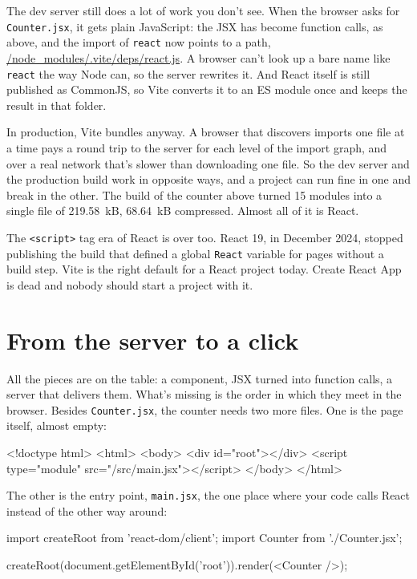 The dev server still does a lot of work you don't see. When the browser asks
for \texttt{Counter.jsx}, it gets plain JavaScript: the JSX has become function
calls, as above, and the import of \texttt{react} now points to a path,
\url{/node_modules/.vite/deps/react.js}. A browser
can't look up a bare name like \texttt{react} the way Node can, so the server
rewrites it. And React itself is still published as CommonJS, so Vite converts
it to an ES module once and keeps the result in that folder.

In production, Vite bundles anyway. A browser that discovers imports one file
at a time pays a round trip to the server for each level of the import graph,
and over a real network that's slower than downloading one file. So the dev
server and the production build work in opposite ways, and a project can run
fine in one and break in the other. The build of the counter above turned 15
modules into a single file of 219.58~kB, 68.64~kB compressed. Almost all of it
is React.

The \texttt{<script>} tag era of React is over too. React 19, in December 2024,
stopped publishing the build that defined a global \texttt{React} variable for
pages without a build step. Vite is the right default for a React project today.
Create React App is dead and nobody should start a project with it.

\section{From the server to a click}
\label{sec:click}

All the pieces are on the table: a component, JSX turned into function calls, a
server that delivers them. What's missing is the order in which they meet in
the browser. Besides \texttt{Counter.jsx}, the counter needs two more files. One
is the page itself, almost empty:

\begin{code}[language={},morestring={[b]"}]
<!doctype html>
<html>
  <body>
    <div id="root"></div>
    <script type="module" src="/src/main.jsx"></script>
  </body>
</html>
\end{code}

The other is the entry point, \texttt{main.jsx}, the one place where your code
calls React instead of the other way around:

\begin{code}
import { createRoot } from 'react-dom/client';
import { Counter } from './Counter.jsx';

createRoot(document.getElementById('root')).render(<Counter />);
\end{code}

